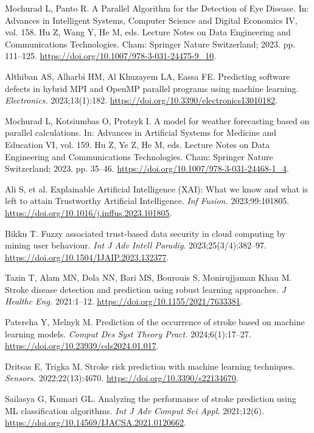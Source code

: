 \begin{enumerate}[label={[\arabic*]},leftmargin=1.2cm]
\item \hypertarget{bib:10}{}Mochurad L, Panto R. A Parallel Algorithm for the Detection of Eye Disease. In: Advances in Intelligent Systems, Computer Science and Digital Economics IV, vol. 158. Hu Z, Wang Y, He M, eds. Lecture Notes on Data Engineering and Communications Technologies. Cham: Springer Nature Switzerland; 2023. pp. 111--125. \url{https://doi.org/10.1007/978-3-031-24475-9_10}.
\item \hypertarget{bib:11}{}Althiban AS, Alharbi HM, Al Khuzayem LA, Eassa FE. Predicting software defects in hybrid MPI and OpenMP parallel programs using machine learning. \textit{Electronics.} 2023;13(1):182. \url{https://doi.org/10.3390/electronics13010182}.
\item \hypertarget{bib:12}{}Mochurad L, Kotsiumbas O, Protsyk I. A model for weather forecasting based on parallel calculations. In: Advances in Artificial Systems for Medicine and Education VI, vol. 159. Hu Z, Ye Z, He M, eds. Lecture Notes on Data Engineering and Communications Technologies. Cham: Springer Nature Switzerland; 2023. pp. 35--46. \url{https://doi.org/10.1007/978-3-031-24468-1_4}.
\item \hypertarget{bib:13}{}Ali S, et al. Explainable Artificial Intelligence (XAI): What we know and what is left to attain Trustworthy Artificial Intelligence. \textit{Inf Fusion.} 2023;99:101805. \url{https://doi.org/10.1016/j.inffus.2023.101805}.
\item \hypertarget{bib:14}{}Bikku T. Fuzzy associated trust-based data security in cloud computing by mining user behaviour. \textit{Int J Adv Intell Paradig.} 2023;25(3/4):382--97. \url{https://doi.org/10.1504/IJAIP.2023.132377}.
\item \hypertarget{bib:15}{}Tazin T, Alam MN, Dola NN, Bari MS, Bourouis S, Monirujjaman Khan M. Stroke disease detection and prediction using robust learning approaches. \textit{J Healthc Eng.} 2021:1--12. \url{https://doi.org/10.1155/2021/7633381}.
\item \hypertarget{bib:16}{}Patereha Y, Melnyk M. Prediction of the occurrence of stroke based on machine learning models. \textit{Comput Des Syst Theory Pract.} 2024;6(1):17--27. \url{https://doi.org/10.23939/cds2024.01.017}.
\item \hypertarget{bib:17}{}Dritsas E, Trigka M. Stroke risk prediction with machine learning techniques. \textit{Sensors.} 2022;22(13):4670. \url{https://doi.org/10.3390/s22134670}.
\item \hypertarget{bib:18}{}Sailasya G, Kumari GL. Analyzing the performance of stroke prediction using ML classification algorithms. \textit{Int J Adv Comput Sci Appl.} 2021;12(6). \url{https://doi.org/10.14569/IJACSA.2021.0120662}.

\end{enumerate}
